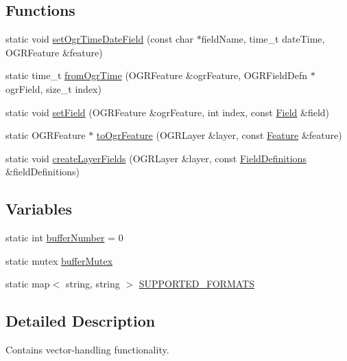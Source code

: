 \subsection*{Functions}
\begin{DoxyCompactItemize}
\item 
static void \hyperlink{namespacedg_1_1deepcore_1_1vector_a94001d40e9e9e2e89410a7138ac11f17}{set\+Ogr\+Time\+Date\+Field} (const char $\ast$field\+Name, time\+\_\+t date\+Time, O\+G\+R\+Feature \&feature)
\item 
static time\+\_\+t \hyperlink{namespacedg_1_1deepcore_1_1vector_aed05f0ef6e8b6c622da4dab04820eb15}{from\+Ogr\+Time} (O\+G\+R\+Feature \&ogr\+Feature, O\+G\+R\+Field\+Defn $\ast$ogr\+Field, size\+\_\+t index)
\item 
static void \hyperlink{namespacedg_1_1deepcore_1_1vector_a9681ed52db63589d467d44d450cb80bd}{set\+Field} (O\+G\+R\+Feature \&ogr\+Feature, int index, const \hyperlink{structdg_1_1deepcore_1_1vector_1_1_field}{Field} \&field)
\item 
static O\+G\+R\+Feature $\ast$ \hyperlink{namespacedg_1_1deepcore_1_1vector_a4cb24d3cb95c30cee40366f3e3cf5854}{to\+Ogr\+Feature} (O\+G\+R\+Layer \&layer, const \hyperlink{classdg_1_1deepcore_1_1vector_1_1_feature}{Feature} \&feature)
\item 
static void \hyperlink{namespacedg_1_1deepcore_1_1vector_af125629571af7f859852eb191087030b}{create\+Layer\+Fields} (O\+G\+R\+Layer \&layer, const \hyperlink{namespacedg_1_1deepcore_1_1vector_a89a39c2fa657ff95f116cfed4a951386}{Field\+Definitions} \&field\+Definitions)
\end{DoxyCompactItemize}
\subsection*{Variables}
\begin{DoxyCompactItemize}
\item 
static int \hyperlink{namespacedg_1_1deepcore_1_1vector_a0ea54c7d7ed3423c8bdc5b777e19a1a3}{buffer\+Number} = 0
\item 
static mutex \hyperlink{namespacedg_1_1deepcore_1_1vector_ad7a8cd187c2310e6fbec1c46bc5ca5a5}{buffer\+Mutex}
\item 
static map$<$ string, string $>$ \hyperlink{namespacedg_1_1deepcore_1_1vector_ae8c82b697aef9d6329705ab30268c18c}{S\+U\+P\+P\+O\+R\+T\+E\+D\+\_\+\+F\+O\+R\+M\+A\+TS}
\end{DoxyCompactItemize}


\subsection{Detailed Description}
Contains vector-\/handling functionality. 

